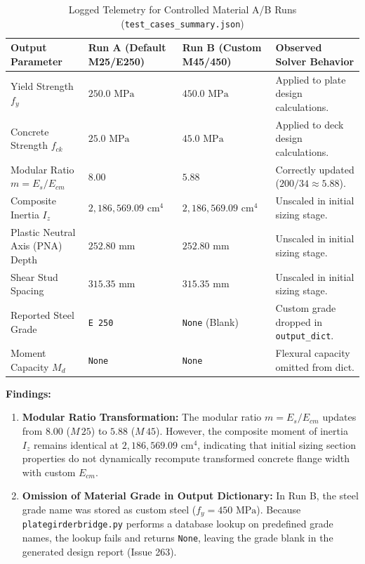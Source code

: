 \documentclass[11pt,a4paper]{article}
\begin{document}
\begin{table}[htbp]
\centering
\small
\caption{Logged Telemetry for Controlled Material A/B Runs (\texttt{test\_cases\_summary.json})}
\label{tab:custom_ab_results}
\begin{tabularx}{\textwidth}{p{3.8cm}p{2.7cm}p{2.7cm}X}
\toprule
\textbf{Output Parameter} & \textbf{Run A (Default M25/E250)} & \textbf{Run B (Custom M45/450)} & \textbf{Observed Solver Behavior} \\
\midrule
Yield Strength $f_y$ & $250.0\text{ MPa}$ & $450.0\text{ MPa}$ & Applied to plate design calculations. \\
Concrete Strength $f_{ck}$ & $25.0\text{ MPa}$ & $45.0\text{ MPa}$ & Applied to deck design calculations. \\
Modular Ratio $m = E_s / E_{cm}$ & $8.00$ & $5.88$ & Correctly updated ($200/34 \approx 5.88$). \\
Composite Inertia $I_z$ & $2,186,569.09\text{ cm}^4$ & $2,186,569.09\text{ cm}^4$ & Unscaled in initial sizing stage. \\
Plastic Neutral Axis (PNA) Depth & $252.80\text{ mm}$ & $252.80\text{ mm}$ & Unscaled in initial sizing stage. \\
Shear Stud Spacing & $315.35\text{ mm}$ & $315.35\text{ mm}$ & Unscaled in initial sizing stage. \\
Reported Steel Grade & \texttt{E 250} & \texttt{None} (Blank) & Custom grade dropped in \texttt{output\_dict}. \\
Moment Capacity $M_d$ & \texttt{None} & \texttt{None} & Flexural capacity omitted from dict. \\
\bottomrule
\end{tabularx}
\end{table}

\textbf{Findings:}
\begin{enumerate}
    \item \textbf{Modular Ratio Transformation:} The modular ratio $m = E_s / E_{cm}$ updates from $8.00$ ($M\,25$) to $5.88$ ($M\,45$). However, the composite moment of inertia $I_z$ remains identical at $2,186,569.09\text{ cm}^4$, indicating that initial sizing section properties do not dynamically recompute transformed concrete flange width with custom $E_{cm}$.
    \item \textbf{Omission of Material Grade in Output Dictionary:} In Run B, the steel grade name was stored as custom steel ($f_y=450\text{ MPa}$). Because \texttt{plategirderbridge.py} performs a database lookup on predefined grade names, the lookup fails and returns \texttt{None}, leaving the grade blank in the generated design report (Issue 263).
\end{enumerate}
\end{document}
